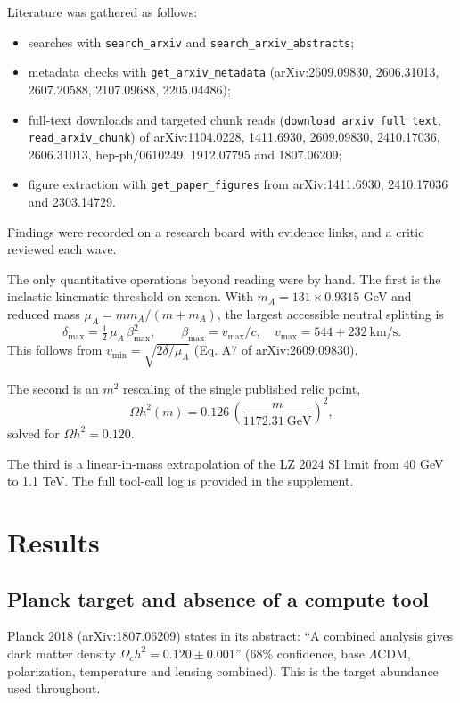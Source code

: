 \documentclass[11pt,a4paper]{article}
\begin{document}
Literature was gathered as follows:
\begin{itemize}
\item searches with \texttt{search\_arxiv} and \texttt{search\_arxiv\_abstracts};
\item metadata checks with \texttt{get\_arxiv\_metadata} (arXiv:2609.09830, 2606.31013, 2607.20588, 2107.09688, 2205.04486);
\item full-text downloads and targeted chunk reads (\texttt{download\_arxiv\_full\_text}, \texttt{read\_arxiv\_chunk}) of arXiv:1104.0228, 1411.6930, 2609.09830, 2410.17036, 2606.31013, hep-ph/0610249, 1912.07795 and 1807.06209;
\item figure extraction with \texttt{get\_paper\_figures} from arXiv:1411.6930, 2410.17036 and 2303.14729.
\end{itemize}
Findings were recorded on a research board with evidence links, and a critic reviewed each wave.

The only quantitative operations beyond reading were by hand. The first is the inelastic kinematic threshold on xenon. With $m_A = 131\times0.9315$ GeV and reduced mass $\mu_A = m m_A/(m+m_A)$, the largest accessible neutral splitting is
\begin{equation}
\delta_{\max} = \tfrac12\,\mu_A\,\beta_{\max}^2,\qquad \beta_{\max} = v_{\max}/c,\quad v_{\max} = 544 + 232\ \mathrm{km/s}.
\end{equation}
This follows from $v_{\min}=\sqrt{2\delta/\mu_A}$ (Eq. A7 of arXiv:2609.09830).

The second is an $m^2$ rescaling of the single published relic point,
\begin{equation}
\Omega h^2(m) = 0.126\,\left(\frac{m}{1172.31\ \mathrm{GeV}}\right)^2 ,
\end{equation}
solved for $\Omega h^2 = 0.120$.

The third is a linear-in-mass extrapolation of the LZ 2024 SI limit from 40 GeV to 1.1 TeV. The full tool-call log is provided in the supplement.

\section{Results}

\subsection{Planck target and absence of a compute tool}
Planck 2018 (arXiv:1807.06209) states in its abstract: ``A combined analysis gives dark matter density $\Omega_c h^2 = 0.120\pm0.001$'' (68\% confidence, base $\Lambda$CDM, polarization, temperature and lensing combined). This is the target abundance used throughout.
\end{document}
